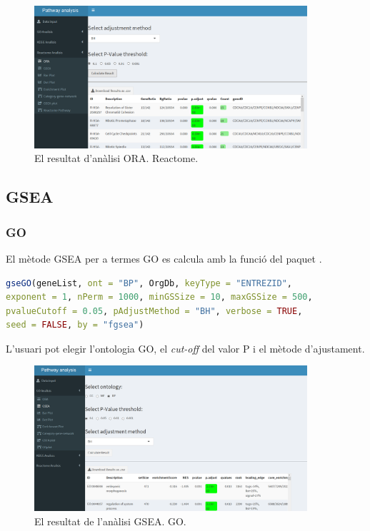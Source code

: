 \documentclass[]{article}
\begin{document}
\begin{figure}[H]
\centering
\includegraphics[width=0.9\textwidth]{App_F10_Items_Reactome_ORA.png} 
\caption{El resultat d'anàlisi ORA. Reactome.}
\end{figure}

\subsection{GSEA}
\subsubsection{GO}
El mètode GSEA per a termes GO es calcula amb la funció  del paquet . 

\begin{lstlisting}[language=R]
gseGO(geneList, ont = "BP", OrgDb, keyType = "ENTREZID",
exponent = 1, nPerm = 1000, minGSSize = 10, maxGSSize = 500,
pvalueCutoff = 0.05, pAdjustMethod = "BH", verbose = TRUE,
seed = FALSE, by = "fgsea")
\end{lstlisting}

L'usuari pot elegir l'ontologia GO, el \textit{cut-off} del valor P i el mètode d'ajustament.
\begin{figure}[H]
\centering
\includegraphics[width=0.9\textwidth]{App_F11_Items_GO_GSEA.png} 
\caption{El resultat de l'anàlisi GSEA. GO.}
\end{figure}
\end{document}
